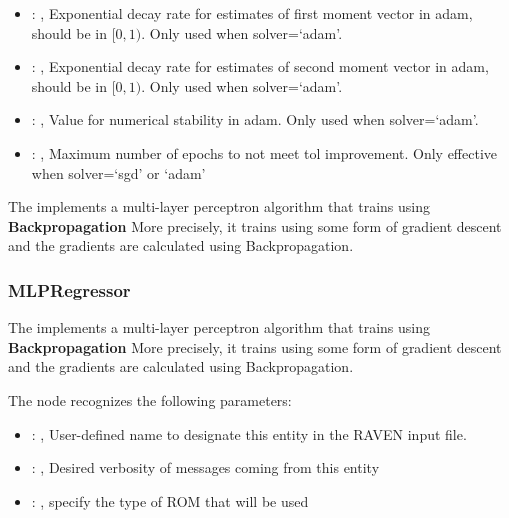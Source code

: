 \begin{itemize}
    \item {}: , 
      Exponential decay rate for estimates of first moment vector in adam, should be in $[0, 1)$.
      Only used when solver=`adam'.

    \item {}: , 
      Exponential decay rate for estimates of second moment vector in adam, should be in $[0, 1)$.
      Only used when solver=`adam'.

    \item {}: , 
      Value for numerical stability in adam. Only used when solver=`adam'.

    \item {}: , 
      Maximum number of epochs to not meet tol improvement. Only effective when
      solver=`sgd' or `adam'
  \end{itemize}
 The  implements a multi-layer perceptron algorithm that trains using
 \textbf{Backpropagation}                             More precisely, it trains using some form of
 gradient descent and the gradients are calculated using Backpropagation.

\subsubsection{MLPRegressor}
  The  implements a multi-layer perceptron algorithm that trains using
  \textbf{Backpropagation}                             More precisely, it trains using some form of
  gradient descent and the gradients are calculated using Backpropagation.

  The  node recognizes the following parameters:
    \begin{itemize}
      \item {}: , 
        User-defined name to designate this entity in the RAVEN input file.
      \item {}: , 
        Desired verbosity of messages coming from this entity
      \item {}: , 
        specify the type of ROM that will be used
  \end{itemize}

